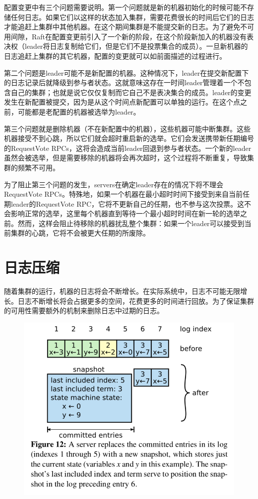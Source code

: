 \documentclass[journal]{IEEEtran}
\begin{document}
配置变更中有三个问题需要说明。第一个问题就是新的机器初始化的时候可能不存储任何日志。如果它们以这样的状态加入集群，需要花费很长的时间后它们的日志才能追赶上集群中其他机器。在这个期间集群是不能提交新的日志。为了避免不可用间隙，Raft在配置变更前引入了一个新的阶段，在这个阶段新加入的机器没有表决权（leader将日志复制给它们，但是它们不是投票集合的成员）。一旦新机器的日志追赶上集群的其它机器，配置的变更就可以如前面描述的过程进行。

第二个问题是leader可能不是新配置的机器。这种情况下，leader在提交新配置下的日志记录后就降级到参与者状态。这就意味这存在一时间leader管理着一个不包含自己的集群；也就是说它仅仅复制而它自己不是表决集合的成员。leader的变更发生在新配置被提交，因为是从这个时间点新配置可以单独的运行。在这个点之前，可能都是老配置的机器被选举为leader。

第三个问题就是删除机器（不在新配置中的机器），这些机器可能中断集群。这些机器接受不到心跳，所以它们就会超时重启新的选举。它们会发送携带新任期编号的RequestVote RPCs，这将会造成当前leader回退到参与者状态。一个新的leader虽然会被选举，但是需要移除的机器将会再次超时，这个过程将不断重复，导致集群的频繁不可用。

为了阻止第三个问题的发生，servers在确定leader存在的情况下将不理会RequestVote RPCs。特殊地，如果一个机器在最小超时时间下接受到来自当前任期leader的RequestVote RPC，它将不更新自己的任期，也不参与这次投票。这不会影响正常的选举，这里每个机器直到等待一个最小超时时间在新一轮的选举之前。然而，这样会阻止待移除的机器扰乱整个集群：如果一个leader可以接受到当前集群的心跳，它将不会被更大任期的所废除。

\section{日志压缩}
随着集群的运行，机器的日志将会不断增长。在实际系统中，日志不可能无限增长。日志不断增长将会占据更多的空间，花费更多的时间进行回放。为了保证集群的可用性需要额外的机制来删除日志中过期的日志。
\begin{figure}[htbp]
\begin{center}
\includegraphics[width=1\linewidth]{./fig12.png}
\end{center}
\end{figure}
\end{document}
